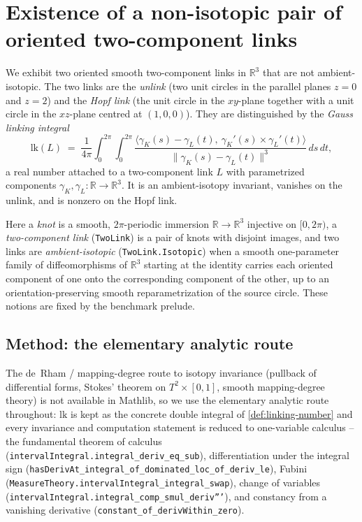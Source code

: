 


\section{Existence of a non-isotopic pair of oriented two-component links}

We exhibit two oriented smooth two-component links in $\mathbb{R}^3$ that are not
ambient-isotopic. The two links are the \emph{unlink} (two unit circles in the
parallel planes $z = 0$ and $z = 2$) and the \emph{Hopf link} (the unit circle
in the $xy$-plane together with a unit circle in the $xz$-plane centred at
$(1,0,0)$). They are distinguished by the \emph{Gauss linking integral}
\[
  \mathrm{lk}(L) \;=\; \frac{1}{4\pi}\int_0^{2\pi}\!\!\int_0^{2\pi}
    \frac{\bigl\langle \gamma_K(s) - \gamma_L(t),\ \gamma_K'(s)\times\gamma_L'(t)\bigr\rangle}
         {\lVert \gamma_K(s) - \gamma_L(t)\rVert^{3}}\, ds\, dt ,
\]
a real number attached to a two-component link $L$ with parametrized components
$\gamma_K,\gamma_L : \mathbb{R}\to\mathbb{R}^3$. It is an ambient-isotopy
invariant, vanishes on the unlink, and is nonzero on the Hopf link.

Here a \emph{knot} is a smooth, $2\pi$-periodic immersion $\mathbb{R}\to\mathbb{R}^3$
injective on $[0,2\pi)$, a \emph{two-component link} (\texttt{TwoLink}) is a pair
of knots with disjoint images, and two links are \emph{ambient-isotopic}
(\texttt{TwoLink.Isotopic}) when a smooth one-parameter family of
diffeomorphisms of $\mathbb{R}^3$ starting at the identity carries each oriented
component of one onto the corresponding component of the other, up to an
orientation-preserving smooth reparametrization of the source circle. These
notions are fixed by the benchmark prelude.

\subsection{Method: the elementary analytic route}

The de~Rham / mapping-degree route to isotopy invariance (pullback of differential
forms, Stokes' theorem on $T^2\times[0,1]$, smooth mapping-degree theory) is not
available in Mathlib, so we use the elementary analytic route throughout:
$\mathrm{lk}$ is kept as the concrete double integral of \cref{def:linking-number}
and every invariance and computation statement is reduced to one-variable
calculus -- the fundamental theorem of calculus
(\texttt{intervalIntegral.integral\_deriv\_eq\_sub}), differentiation under the
integral sign (\texttt{hasDerivAt\_integral\_of\_dominated\_loc\_of\_deriv\_le}),
Fubini (\texttt{MeasureTheory.intervalIntegral\_integral\_swap}), change of
variables (\texttt{intervalIntegral.integral\_comp\_smul\_deriv'''}), and
constancy from a vanishing derivative (\texttt{constant\_of\_derivWithin\_zero}).

